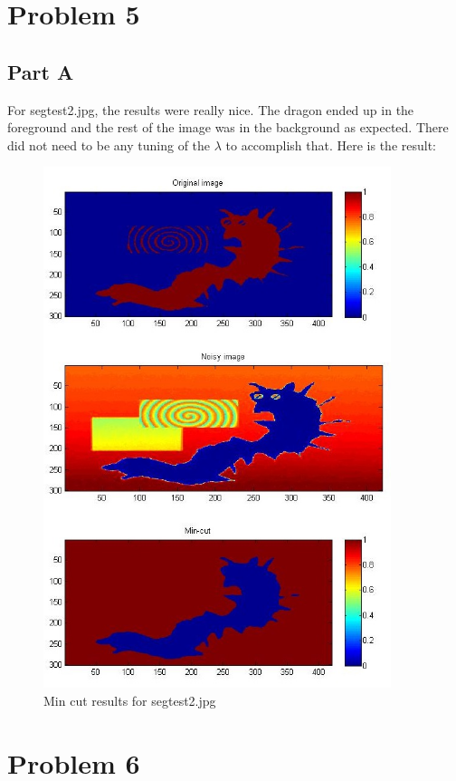 \documentclass[11pt,psfig]{article}
\begin{document}
\newpage

\section*{Problem 5}

\subsection*{Part A}

For segtest2.jpg, the results were really nice. The dragon ended up in the foreground and the rest of the image was in the background as expected. There did not need to be any tuning of the $\lambda$ to accomplish that. Here is the result:

\begin{figure}[H]
\centering
\includegraphics[width=4in]{prob5plotA.jpg}
\caption{Min cut results for segtest2.jpg}
\end{figure}

\newpage

\section*{Problem 6}
\end{document}
